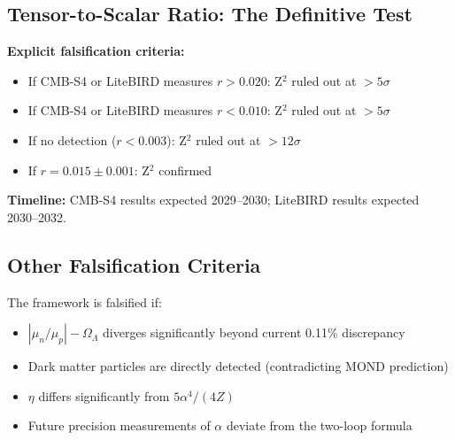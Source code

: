 \documentclass[11pt,a4paper]{article}
\theoremstyle{plain}
\theoremstyle{definition}
\theoremstyle{remark}
\newcommand{\OmegaL}{\Omega_\Lambda}
\begin{document}
\subsection{Tensor-to-Scalar Ratio: The Definitive Test}

\begin{center}
\end{center}

\textbf{Explicit falsification criteria:}
\begin{itemize}
  \item If CMB-S4 or LiteBIRD measures $r > 0.020$: Z$^2$ ruled out at $>5\sigma$
  \item If CMB-S4 or LiteBIRD measures $r < 0.010$: Z$^2$ ruled out at $>5\sigma$
  \item If no detection ($r < 0.003$): Z$^2$ ruled out at $>12\sigma$
  \item If $r = 0.015 \pm 0.001$: Z$^2$ confirmed
\end{itemize}

\textbf{Timeline:} CMB-S4 results expected 2029--2030; LiteBIRD results expected 2030--2032.

\subsection{Other Falsification Criteria}

The framework is falsified if:
\begin{itemize}
  \item $|\mu_n/\mu_p| - \OmegaL$ diverges significantly beyond current 0.11\% discrepancy
  \item Dark matter particles are directly detected (contradicting MOND prediction)
  \item $\eta$ differs significantly from $5\alpha^4/(4Z)$
  \item Future precision measurements of $\alpha$ deviate from the two-loop formula
\end{itemize}
\end{document}
